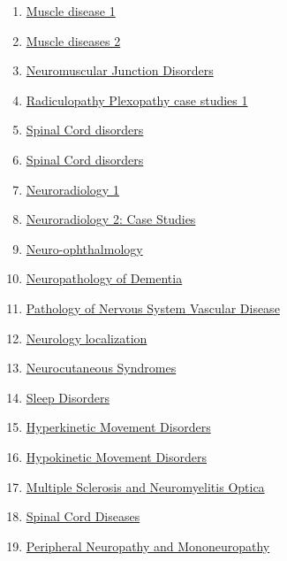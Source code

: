 \documentclass[11pt]{article}
\begin{document}
\begin{multicols}{2}
	\begin{enumerate}
		\item \href{https://mp.weixin.qq.com/s/woBh3WUwiwTkUJ9Xc9NVaA}{Muscle disease 1}	%
		\item \href{https://mp.weixin.qq.com/s/EltJlxQoSr9ZitmQ4Zu8Nw}{Muscle diseases 2}	%
		\item \href{https://mp.weixin.qq.com/s/WW1STeJ4xmr1i_E8vBN8tw}{Neuromuscular Junction Disorders}	%
		\item \href{https://mp.weixin.qq.com/s/1Q9CCbW9ojHDKp04YiUXPQ}{Radiculopathy Plexopathy case studies 1}	%
		\item \href{https://mp.weixin.qq.com/s/7gPqTXY6Aj4N15L0iUQ0Nw}{Spinal Cord disorders}	%
		\item \href{https://mp.weixin.qq.com/s/rYprckSDzSdws23i4FalBg}{Spinal Cord disorders}	%
		\item \href{https://mp.weixin.qq.com/s/jzyo4VgagwL2mWhgVgcPOw}{Neuroradiology 1}	%
		\item \href{https://mp.weixin.qq.com/s/Txmdz0LrF9C_jbaXtRZK1w}{Neuroradiology 2: Case Studies}	%
		\item \href{https://mp.weixin.qq.com/s/kikpr2ZtzIXISmdCxF12hA}{Neuro-ophthalmology}	%
		\item \href{https://mp.weixin.qq.com/s/kJP4NgfT0RCT_aDgxSmi3A}{Neuropathology of Dementia}	%
		\item \href{https://mp.weixin.qq.com/s/WULoekoKQirHxmmz6PDDjg}{Pathology of Nervous System Vascular Disease}	%
		\item \href{https://mp.weixin.qq.com/s/0bb7uGC_W0t3XnYKsOKBrg}{Neurology localization}	%
		\item \href{https://mp.weixin.qq.com/s/t1YvTVkcpQh4I4iNSEP73A}{Neurocutaneous Syndromes}	%
		\item \href{https://mp.weixin.qq.com/s/BgWeiNy_DLODvWMSq5nwfg}{Sleep Disorders}	%
		\item \href{https://mp.weixin.qq.com/s/513ES5d8ZVZZAXBYJLaOmg}{Hyperkinetic Movement Disorders}	%
		\item \href{https://mp.weixin.qq.com/s/2ZAlKAwNMStrTWt5KWOEHg}{Hypokinetic Movement Disorders}	%
		\item \href{https://mp.weixin.qq.com/s/mkzQX7y1U80Pv3z6Gq2VVg}{Multiple Sclerosis and Neuromyelitis Optica}	%
		\item \href{https://mp.weixin.qq.com/s/gZWW9UtsDDGXepF_QWJaaA}{Spinal Cord Diseases}	%
		\item \href{https://mp.weixin.qq.com/s/3nIlmbzb4VKr_MnueNFDtA}{Peripheral Neuropathy and Mononeuropathy}	%

\end{enumerate}
\end{multicols}
\end{document}
